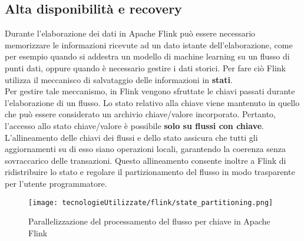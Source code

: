 {\subsection{Alta disponibilità e recovery}
Durante l'elaborazione dei dati in Apache Flink può essere necessario memorizzare le informazioni ricevute ad un dato istante dell'elaborazione, come per esempio quando si addestra un modello di machine learning su un flusso di punti dati, oppure quando è necessario gestire i dati storici. Per fare ciò Flink utilizza il meccanisco di salvataggio delle informazioni in \textbf{stati}.\\
Per gestire tale meccanismo, in Flink vengono sfruttate le chiavi passati durante l'elaborazione di un flusso. Lo stato relativo alla chiave viene mantenuto in quello che può essere considerato un archivio chiave/valore incorporato. Pertanto, l'accesso allo stato chiave/valore è possibile \textbf{solo su flussi con chiave}. L'allineamento delle chiavi dei flussi e dello stato assicura che tutti gli aggiornamenti su di esso siano operazioni locali, garantendo la coerenza senza sovraccarico delle transazioni. Questo allineamento consente inoltre a Flink di ridistribuire lo stato e regolare il partizionamento del flusso in modo trasparente per l'utente programmatore.

\begin{figure}[!h] 
    \centering 
    \texttt{[image: tecnologieUtilizzate/flink/state\_partitioning.png]} 
    \caption{Parallelizzazione del processamento del flusso per chiave in Apache Flink}
\end{figure}

}
